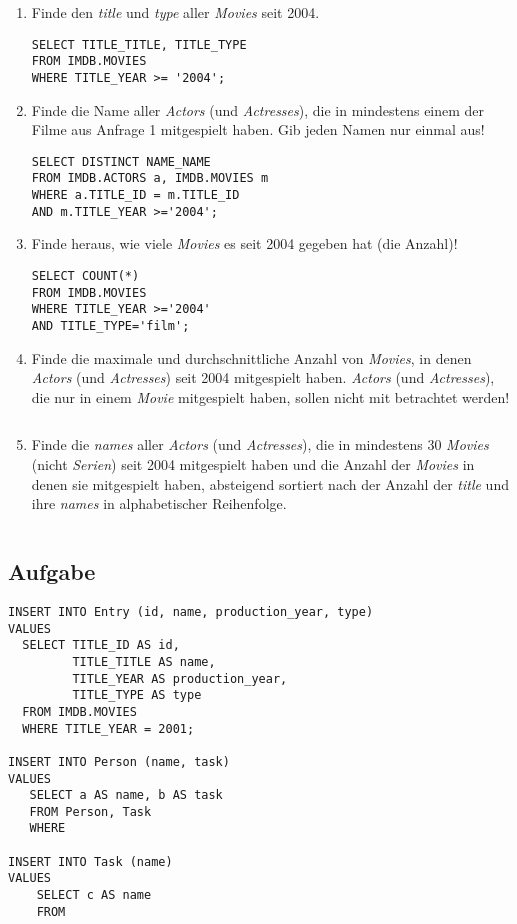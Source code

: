 \documentclass[11pt,a4paper,DIV=9]{scrartcl}
\newcounter{temp}
\newcommand{\aufgabe}[1]{
  \setcounter{temp}{\value{subsection}}
  \setcounter{subsection}{#1}
  \addtocounter{subsection}{-1}
  \subsection{Aufgabe}
  \setcounter{subsection}{\value{temp}}
}
\begin{document}
\begin{enumerate}

\item Finde den \textit{title} und \textit{type} aller \textit{Movies} seit 2004. 
\begin{lstlisting} 
SELECT TITLE_TITLE, TITLE_TYPE
FROM IMDB.MOVIES
WHERE TITLE_YEAR >= '2004';
\end{lstlisting}

\item Finde die Name aller \textit{Actors} (und \textit{Actresses}), die in mindestens einem der Filme aus Anfrage 1 mitgespielt haben. Gib jeden Namen nur einmal aus!
\begin{lstlisting}
SELECT DISTINCT NAME_NAME
FROM IMDB.ACTORS a, IMDB.MOVIES m
WHERE a.TITLE_ID = m.TITLE_ID
AND m.TITLE_YEAR >='2004';
\end{lstlisting}

\item Finde heraus, wie viele \textit{Movies} es seit 2004 gegeben hat (die Anzahl)!
\begin{lstlisting}
SELECT COUNT(*)
FROM IMDB.MOVIES
WHERE TITLE_YEAR >='2004'
AND TITLE_TYPE='film';
\end{lstlisting}

\item Finde die maximale und durchschnittliche Anzahl von \textit{Movies}, in denen \textit{Actors} (und \textit{Actresses}) seit 2004 mitgespielt haben. \textit{Actors} (und \textit{Actresses}), die nur in einem \textit{Movie} mitgespielt haben, sollen nicht mit betrachtet werden!
\begin{lstlisting}
\end{lstlisting}

\item Finde die \textit{names} aller \textit{Actors} (und \textit{Actresses}), die in mindestens 30 \textit{Movies} (nicht \textit{Serien}) seit 2004 mitgespielt haben und die Anzahl der \textit{Movies} in denen sie mitgespielt haben, absteigend sortiert nach der Anzahl der \textit{title} und ihre \textit{names} in alphabetischer Reihenfolge.
\begin{lstlisting}
\end{lstlisting}
\end{enumerate}

\aufgabe{4}
\begin{lstlisting}
INSERT INTO Entry (id, name, production_year, type)
VALUES
  SELECT TITLE_ID AS id,
         TITLE_TITLE AS name,
         TITLE_YEAR AS production_year,
         TITLE_TYPE AS type
  FROM IMDB.MOVIES
  WHERE TITLE_YEAR = 2001;

INSERT INTO Person (name, task)
VALUES
   SELECT a AS name, b AS task
   FROM Person, Task
   WHERE

INSERT INTO Task (name)
VALUES
    SELECT c AS name
    FROM 
\end{lstlisting}
\end{document}
